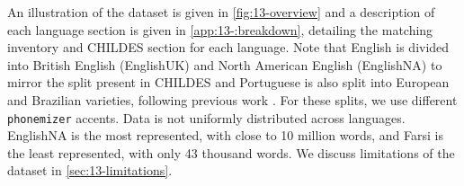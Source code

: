 
An illustration of the dataset is given in \cref{fig:13-overview} and a description of each language section is given in \cref{app:13-:breakdown}, detailing the matching \phoible inventory and CHILDES section for each language. Note that English is divided into British English (EnglishUK) and North American English (EnglishNA) to mirror the split present in CHILDES and Portuguese is also split into European and Brazilian varieties, following previous work \citep{caines2019cross, goriely2023word}. For these splits, we use different \texttt{phonemizer} accents. Data is not uniformly distributed across languages. EnglishNA is the most represented, with close to 10 million words, and Farsi is the least represented, with only 43 thousand words. We discuss limitations of the dataset in \cref{sec:13-limitations}.

